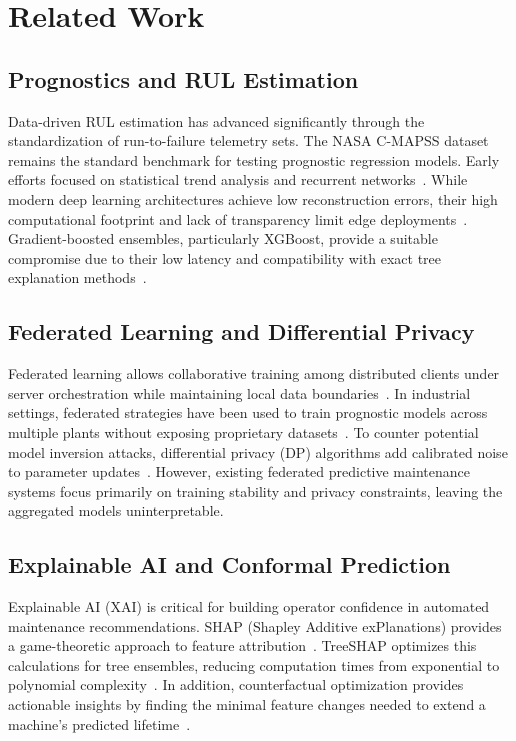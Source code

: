 \documentclass[letterpaper, 10 pt, conference]{ieeeconf}
\begin{document}
\section{Related Work}
\label{sec:literature}

\subsection{Prognostics and RUL Estimation}
Data-driven RUL estimation has advanced significantly through the standardization of run-to-failure telemetry sets. The NASA C-MAPSS dataset~\cite{cmapss} remains the standard benchmark for testing prognostic regression models. Early efforts focused on statistical trend analysis and recurrent networks~\cite{heimes2008,babu2016}. While modern deep learning architectures achieve low reconstruction errors, their high computational footprint and lack of transparency limit edge deployments~\cite{asif2022}. Gradient-boosted ensembles, particularly XGBoost, provide a suitable compromise due to their low latency and compatibility with exact tree explanation methods~\cite{chen2016xgboost,pan2025}.

\subsection{Federated Learning and Differential Privacy}
Federated learning allows collaborative training among distributed clients under server orchestration while maintaining local data boundaries~\cite{mcmahan2017,yang2019fl,flower}. In industrial settings, federated strategies have been used to train prognostic models across multiple plants without exposing proprietary datasets~\cite{ahn2023,sah2025}. To counter potential model inversion attacks, differential privacy (DP) algorithms add calibrated noise to parameter updates~\cite{dwork2006,abadi2016}. However, existing federated predictive maintenance systems focus primarily on training stability and privacy constraints, leaving the aggregated models uninterpretable.

\subsection{Explainable AI and Conformal Prediction}
Explainable AI (XAI) is critical for building operator confidence in automated maintenance recommendations. SHAP (Shapley Additive exPlanations) provides a game-theoretic approach to feature attribution~\cite{lundberg2017}. TreeSHAP optimizes this calculations for tree ensembles, reducing computation times from exponential to polynomial complexity~\cite{lundberg2020}. In addition, counterfactual optimization provides actionable insights by finding the minimal feature changes needed to extend a machine's predicted lifetime~\cite{wachter2017,molnar2022}.
\end{document}

